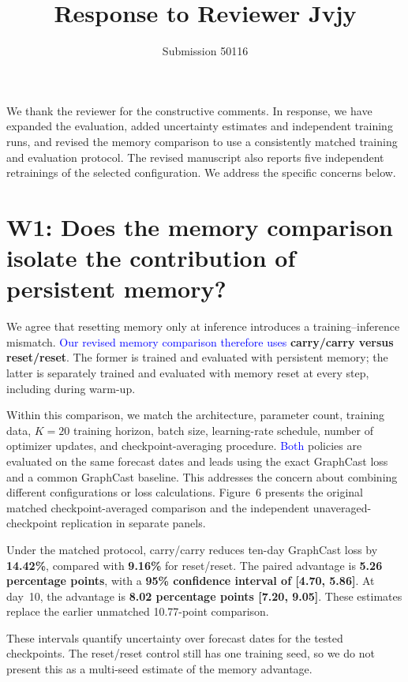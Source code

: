 \documentclass[11pt]{article}
\title{Response to Reviewer Jvjy}
\author{Submission 50116}
\date{}
\begin{document}
\maketitle
\vspace{-1.5em}

We thank the reviewer for the constructive comments. In response, we have expanded the evaluation, added uncertainty estimates and independent training runs, and revised the memory comparison to use a consistently matched training and evaluation protocol. The revised manuscript also reports five independent retrainings of the selected configuration. We address the specific concerns below.

\section*{W1: Does the memory comparison isolate the contribution of persistent memory?}

We agree that resetting memory only at inference introduces a training--inference mismatch. \textcolor{blue}{Our revised memory comparison therefore uses} \textbf{carry/carry versus reset/reset}. The former is trained and evaluated with persistent memory; the latter is separately trained and evaluated with memory reset at every step, including during warm-up.

Within this comparison, we match the architecture, parameter count, training data, $K=20$ training horizon, batch size, learning-rate schedule, number of optimizer updates, and checkpoint-averaging procedure. \textcolor{blue}{Both} policies are evaluated on the same forecast dates and leads using the exact GraphCast loss and a common GraphCast baseline. This addresses the concern about combining different configurations or loss calculations. Figure~6 presents the original matched checkpoint-averaged comparison and the independent unaveraged-checkpoint replication in separate panels.

Under the matched protocol, carry/carry reduces ten-day GraphCast loss by \textbf{14.42\%}, compared with \textbf{9.16\%} for reset/reset. The paired advantage is \textbf{5.26 percentage points}, with a \textbf{95\% confidence interval of [4.70, 5.86]}. At day~10, the advantage is \textbf{8.02 percentage points [7.20, 9.05]}. These estimates replace the earlier unmatched 10.77-point comparison.

These intervals quantify uncertainty over forecast dates for the tested checkpoints. The reset/reset control still has one training seed, so we do not present this as a multi-seed estimate of the memory advantage.
\end{document}
